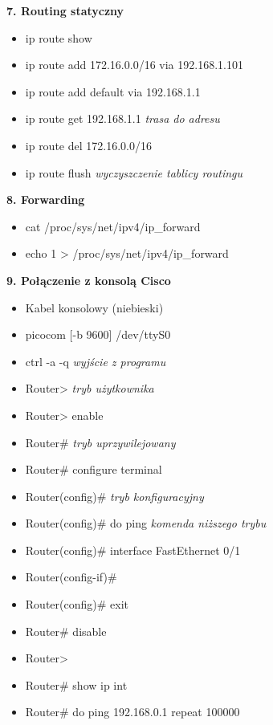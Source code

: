 \documentclass[8pt]{extarticle}
\begin{document}
\begin{multicols*}{3}
\textbf{7. Routing statyczny}
\begin{itemize}
\item ip route show
\item ip route add 172.16.0.0/16 via 192.168.1.101
\item ip route add default via 192.168.1.1
\item ip route get 192.168.1.1 \emph{trasa do adresu}
\item ip route del 172.16.0.0/16
\item ip route flush \emph{wyczyszczenie tablicy routingu}
\end{itemize}

\textbf{8. Forwarding}
\begin{itemize}
\item cat /proc/sys/net/ipv4/ip\_forward
\item echo 1 > /proc/sys/net/ipv4/ip\_forward
\end{itemize}

\textbf{9. Połączenie z konsolą Cisco}
\begin{itemize}
\item Kabel konsolowy (niebieski)
\item picocom [-b 9600] /dev/ttyS0
\item ctrl -a -q \emph{wyjście z programu}
\item Router> \emph{tryb użytkownika}
\item Router> enable
\item Router\# \emph{tryb uprzywilejowany}
\item Router\# configure terminal
\item Router(config)\# \emph{tryb konfiguracyjny}
\item Router(config)\# do ping \emph{komenda niższego trybu}
\item Router(config)\# interface FastEthernet 0/1
\item Router(config-if)\# 
\item Router(config)\# exit
\item Router\# disable
\item Router>
\item Router\# show ip int 
\item Router\# do ping 192.168.0.1 repeat 100000
\end{itemize}
\end{multicols*}
\end{document}
